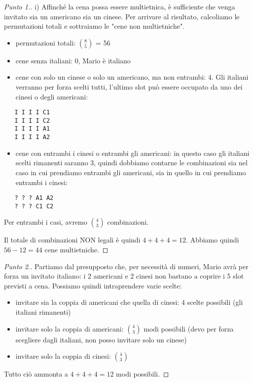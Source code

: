 \documentclass[12pt]{article}
\renewcommand\qedsymbol{$\square$}
\begin{document}
\renewcommand\qedsymbol{$\square$}

\begin{proof}[Punto 1.]
i) Affinché la cena possa essere multietnica, è sufficiente che venga invitato sia un americano sia un cinese. Per arrivare al risultato, calcoliamo le permutazioni totali e sottraiamo le "cene non multietniche".

\begin{itemize}
\item permutazioni totali: ${8 \choose 5}$ = 56
\item cene senza italiani: 0, Mario è italiano
\item cene con solo un cinese o solo un americano, ma non entrambi: 4. Gli italiani verranno per forza scelti tutti, l'ultimo slot può essere occupato da uno dei cinesi o degli americani:
\end{itemize}

\begin{verbatim}
   I I I I C1
   I I I I C2
   I I I I A1
   I I I I A2
\end{verbatim}

\begin{itemize}
     \item cene con entrambi i cinesi o entrambi gli americani: in questo caso gli italiani scelti rimanenti saranno 3, quindi dobbiamo contarne le combinazioni sia nel caso in cui prendiamo entrambi gli americani, sia in quello in cui prendiamo entrambi i cinesi:
\end{itemize}

\begin{verbatim}
   ? ? ? A1 A2
   ? ? ? C1 C2
\end{verbatim}

Per entrambi i casi, avremo ${4 \choose 3}$ combinazioni.

Il totale di combinazioni NON legali è quindi $4 + 4 + 4 = 12$. Abbiamo quindi $56 - 12 = 44$ cene multietniche. \end{proof}

\renewcommand\qedsymbol{$\blacksquare$}

\begin{proof}[Punto 2.]
Partiamo dal presupposto che, per necessità di numeri, Mario avrà per forza un invitato italiano: i 2 americani e 2 cinesi non bastano a coprire i 5 slot previsti a cena. Possiamo quindi intraprendere varie scelte:

\begin{itemize}
     \item invitare sia la coppia di americani che quella di cinesi: 4 scelte possibili (gli italiani rimanenti)
     \item invitare solo la coppia di americani: ${4 \choose 3}$ modi possibili (devo per forza scegliere dagli italiani, non posso invitare solo un cinese)
     \item invitare solo la coppia di cinesi: ${4 \choose 3}$
\end{itemize}

Tutto ciò ammonta a $4 + 4 + 4 = 12$  modi possibili.

\end{proof}
\end{document}
